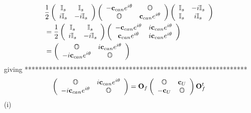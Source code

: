\documentclass[aps,preprint]{revtex4}%
\begin{document}
\begin{align*}
&  \frac{1}{2}\left(
\begin{array}
[c]{cc}%
\mathbb{I}_{s} & \mathbb{I}_{s}\\
i\mathbb{I}_{s} & -i\mathbb{I}_{s}%
\end{array}
\right)  \left(
\begin{array}
[c]{cc}%
-\mathbf{c}_{can}e^{i\mathbf{\theta}} & \mathbb{O}\\
\mathbb{O} & \mathbf{c}_{can}e^{i\mathbf{\theta}}%
\end{array}
\right)  \left(
\begin{array}
[c]{cc}%
\mathbb{I}_{s} & -i\mathbb{I}_{s}\\
\mathbb{I}_{s} & i\mathbb{I}_{s}%
\end{array}
\right) \\
&  =\frac{1}{2}\left(
\begin{array}
[c]{cc}%
\mathbb{I}_{s} & \mathbb{I}_{s}\\
i\mathbb{I}_{s} & -i\mathbb{I}_{s}%
\end{array}
\right)  \left(
\begin{array}
[c]{cc}%
-\mathbf{c}_{can}e^{i\mathbf{\theta}} & i\mathbf{c}_{can}e^{i\mathbf{\theta}%
}\\
\mathbf{c}_{can}e^{i\mathbf{\theta}} & i\mathbf{c}_{can}e^{i\mathbf{\theta}}%
\end{array}
\right) \\
&  =\left(
\begin{array}
[c]{cc}%
\mathbb{O} & i\mathbf{c}_{can}e^{i\mathbf{\theta}}\\
-i\mathbf{c}_{can}e^{i\mathbf{\theta}} & \mathbb{O}%
\end{array}
\right)
\end{align*}
giving ****************************************************************%
\[
\left(
\begin{array}
[c]{cc}%
\mathbb{O} & i\mathbf{c}_{can}e^{i\mathbf{\theta}}\\
-i\mathbf{c}_{can}e^{i\mathbf{\theta}} & \mathbb{O}%
\end{array}
\right)  =\mathbf{O}_{f}\left(
\begin{array}
[c]{cc}%
\mathbb{O} & \mathbf{c}_{U}\\
-\mathbf{c}_{U} & \mathbb{O}%
\end{array}
\right)  \mathbf{O}_{f}^{t}%
\]
(i)%
\end{document}
